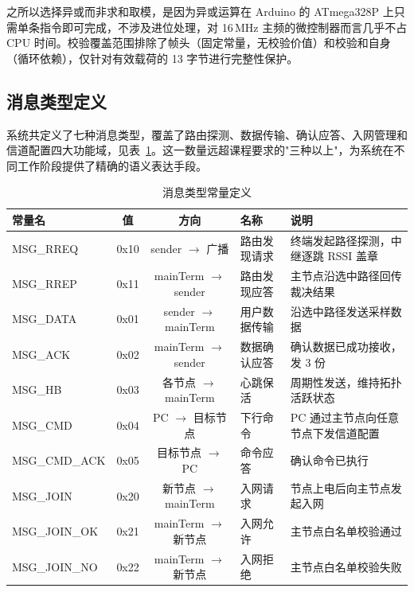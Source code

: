 \documentclass[12pt,a4paper]{ctexart}
\newcommand{\tblheaderstyle}{\sffamily\small\color{white}}
\begin{document}
之所以选择异或而非求和取模，是因为异或运算在 Arduino 的 ATmega328P 上只需单条指令即可完成，不涉及进位处理，对 16\,MHz 主频的微控制器而言几乎不占 CPU 时间。校验覆盖范围排除了帧头（固定常量，无校验价值）和校验和自身（循环依赖），仅针对有效载荷的 13 字节进行完整性保护。

\subsection{消息类型定义}
\label{sec:msgtypes}

系统共定义了七种消息类型，覆盖了路由探测、数据传输、确认应答、入网管理和信道配置四大功能域，见表~\ref{tab:msgtypes}。这一数量远超课程要求的"三种以上"，为系统在不同工作阶段提供了精确的语义表达手段。

\begin{table}[htbp]
\centering
\caption{消息类型常量定义}
\label{tab:msgtypes}
\begin{tabularx}{\textwidth}{l c c l >{\raggedright\arraybackslash}X}
\toprule
\rowcolor{tblhead}\tblheaderstyle 常量名 & \tblheaderstyle 值 & \tblheaderstyle 方向 & \tblheaderstyle 名称 & \tblheaderstyle 说明 \\
\midrule
MSG\_RREQ    & 0x10 & sender $\to$ 广播       & 路由发现请求   & 终端发起路径探测，中继逐跳 RSSI 盖章 \\
MSG\_RREP    & 0x11 & mainTerm $\to$ sender   & 路由发现应答   & 主节点沿选中路径回传裁决结果 \\
MSG\_DATA    & 0x01 & sender $\to$ mainTerm   & 用户数据传输   & 沿选中路径发送采样数据 \\
MSG\_ACK     & 0x02 & mainTerm $\to$ sender   & 数据确认应答   & 确认数据已成功接收，发 3 份 \\
MSG\_HB      & 0x03 & 各节点 $\to$ mainTerm   & 心跳保活       & 周期性发送，维持拓扑活跃状态 \\
MSG\_CMD     & 0x04 & PC $\to$ 目标节点       & 下行命令       & PC 通过主节点向任意节点下发信道配置 \\
MSG\_CMD\_ACK& 0x05 & 目标节点 $\to$ PC       & 命令应答       & 确认命令已执行 \\
MSG\_JOIN    & 0x20 & 新节点 $\to$ mainTerm   & 入网请求       & 节点上电后向主节点发起入网 \\
MSG\_JOIN\_OK& 0x21 & mainTerm $\to$ 新节点   & 入网允许       & 主节点白名单校验通过 \\
MSG\_JOIN\_NO& 0x22 & mainTerm $\to$ 新节点   & 入网拒绝       & 主节点白名单校验失败 \\
\bottomrule
\end{tabularx}
\end{table}
\end{document}
